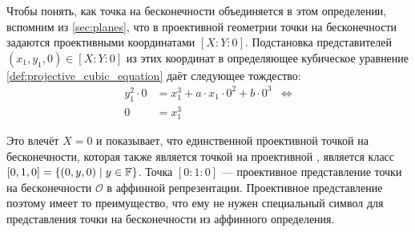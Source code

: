 Чтобы понять, как точка на бесконечности объединяется в этом определении, вспомним из \secname{} \ref{sec:planes}, что в проективной геометрии точки на бесконечности задаются проективными координатами $[X:Y:0]$. Подстановка представителей $(x_1,y_1,0)\in [X:Y:0]$ из этих координат в определяющее кубическое уравнение \ref{def:projective_cubic_equation} даёт следующее тождество:
\begin{align*}
y_1^2\cdot 0 & = x_1^3+a\cdot x_1\cdot 0^2 + b\cdot 0^3 & \Leftrightarrow \\
0 & = x_1^3
\end{align*} 

Это влечёт $X=0$ и показывает, что единственной проективной точкой на бесконечности, которая также является точкой на проективной , является класс $[0,1,0] = \{(0,y,0)\;|\; y\in \mathbb{F}\}$. Точка $[0:1:0]$ — проективное представление точки на бесконечности $\mathcal{O}$ в аффинной репрезентации. Проективное представление  поэтому имеет то преимущество, что ему не нужен специальный символ для представления точки на бесконечности из аффинного определения.

